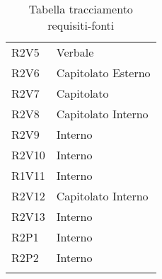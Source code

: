\begin{center}
\begin{longtable}{  p{5cm} p{5cm} }
		R2V5 & Verbale \\
		R2V6 & Capitolato \newline Esterno \\
		R2V7 & Capitolato \\
		R2V8 & Capitolato \newline Interno \\
		R2V9 & Interno \\
		R2V10 & Interno \\
		R1V11 & Interno \\
		R2V12 & Capitolato \newline Interno \\
		R2V13 & Interno \\		
		R2P1 & Interno \\
		R2P2 & Interno \\
		\rowcolor{white}
	\caption{Tabella tracciamento requisiti-fonti}
	\end{longtable}
\end{center}

